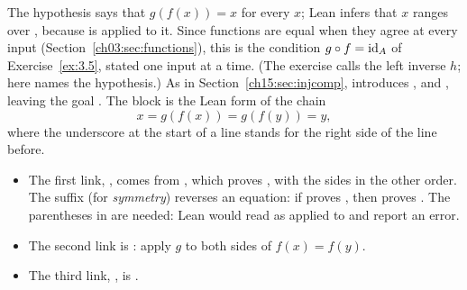 The hypothesis  says that $g(f(x))=x$ for every $x$; Lean infers that $x$ ranges over , because  is applied to it. Since functions are equal when they agree at every input (Section~\ref{ch03:sec:functions}), this is the condition $g\circ f=\operatorname{id}_A$ of Exercise~\ref{ex:3.5}, stated one input at a time. (The exercise calls the left inverse $h$; here  names the hypothesis.) As in Section~\ref{ch15:sec:injcomp},  introduces ,  and , leaving the goal . The  block is the Lean form of the chain
\[
x=g(f(x))=g(f(y))=y,
\]
where the underscore at the start of a line stands for the right side of the line before.
\begin{itemize}
\item The first link, , comes from , which proves , with the sides in the other order. The suffix  (for \emph{symmetry}) reverses an equation: if  proves , then  proves . The parentheses in  are needed: Lean would read  as  applied to  and report an error.
\item The second link is : apply $g$ to both sides of $f(x)=f(y)$.
\item The third link, , is .
\end{itemize}

